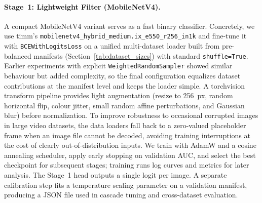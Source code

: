 \paragraph{Stage~1: Lightweight Filter (MobileNetV4).} A compact MobileNetV4 variant serves as a fast binary classifier. Concretely, we use timm's \verb|mobilenetv4_hybrid_medium.ix_e550_r256_in1k| and fine\hyp tune it with \verb|BCEWithLogitsLoss| on a unified multi\hyp dataset loader built from pre\hyp balanced manifests (Section~\ref{tab:dataset_sizes}) with standard \verb|shuffle=True|. Earlier experiments with explicit \verb|WeightedRandomSampler| showed similar behaviour but added complexity, so the final configuration equalizes dataset contributions at the manifest level and keeps the loader simple. A torchvision transform pipeline provides light augmentation (resize to \SI{256}{px}, random horizontal flip, colour jitter, small random affine perturbations, and Gaussian blur) before normalization. To improve robustness to occasional corrupted images in large video datasets, the data loaders fall back to a zero\hyp valued placeholder frame when an image file cannot be decoded, avoiding training interruptions at the cost of clearly out\hyp of\hyp distribution inputs. We train with AdamW and a cosine annealing scheduler, apply early stopping on validation AUC, and select the best checkpoint for subsequent stages; training runs log curves and metrics for later analysis. The Stage~1 head outputs a single logit per image. A separate calibration step fits a temperature scaling parameter on a validation manifest, producing a JSON file used in cascade tuning and cross\hyp dataset evaluation.

